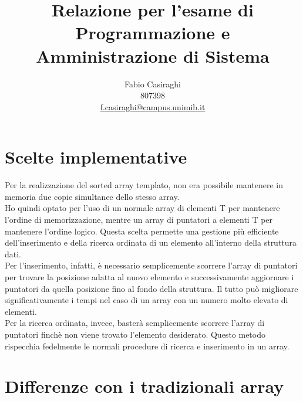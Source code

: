 \documentclass[11pt]{article}
\author{Fabio Casiraghi \\807398 \\ \href{mailto:f.casiraghi@campus.unimib.it} {f.casiraghi@campus.unimib.it}}
\title{Relazione per l'esame di Programmazione e Amministrazione di Sistema}
\begin{document}
\maketitle
\vspace{2cm}

\section*{Scelte implementative}
Per la realizzazione del sorted array templato, non era possibile mantenere in memoria
due copie simultanee dello stesso array. \\
Ho quindi optato per l'uso di un normale array di elementi T per mantenere l'ordine di memorizzazione,
mentre un array di puntatori a elementi T per mantenere l'ordine logico. Questa scelta permette
una gestione più efficiente dell'inserimento e della ricerca ordinata di un elemento all'interno della
struttura dati.\\
Per l'inserimento, infatti, è necessario semplicemente scorrere l'array di puntatori per trovare la 
posizione adatta al nuovo elemento e successivamente aggiornare i puntatori da quella posizione fino al fondo
della struttura. Il tutto può migliorare significativamente i tempi nel caso di un array 
con un numero molto elevato di elementi.\\
Per la ricerca ordinata, invece, basterà semplicemente scorrere l'array di puntatori finchè non viene 
trovato l'elemento desiderato. Questo metodo rispecchia fedelmente le normali procedure di ricerca e inserimento 
in un array.
\section*{Differenze con i tradizionali array}
\end{document}
